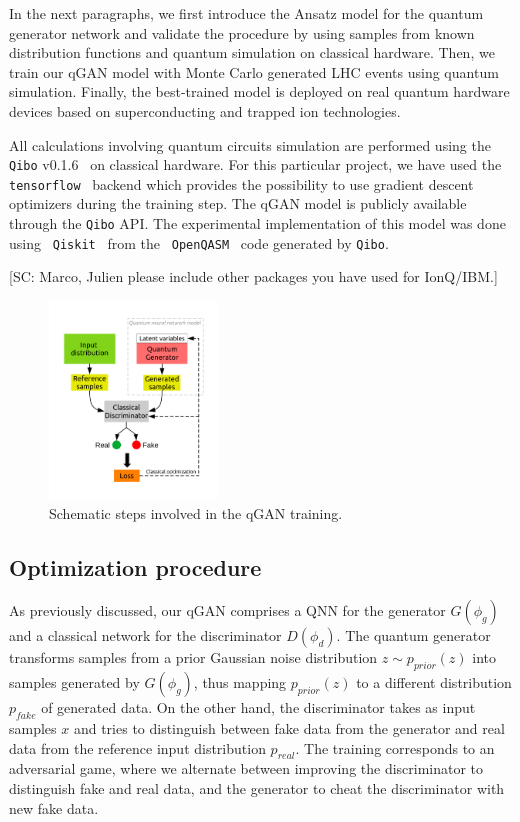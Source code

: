 \documentclass[twocolumn,preprintnumbers,superscriptaddress]{revtex4-2}
\begin{document}
In the next paragraphs, we first introduce the Ansatz model for the quantum
generator network and validate the procedure by using samples from known
distribution functions and quantum simulation on classical hardware. Then, we
train our qGAN model with Monte Carlo generated LHC events using quantum
simulation. Finally, the best-trained model is deployed on real quantum hardware
devices based on superconducting and trapped ion technologies.

All calculations involving quantum circuits simulation are performed using the
{\tt Qibo} v0.1.6~\cite{efthymiou2020qibo,stavros_efthymiou_2021_5088103} on
classical hardware. For this particular project, we have used the {\tt
tensorflow}~\cite{tensorflow2015-whitepaper} backend which provides the
possibility to use gradient descent optimizers during the training step. The
qGAN model is publicly available through the {\tt Qibo} API. The experimental
implementation of this model was done using {\tt
Qiskit}~\cite{gadi_aleksandrowicz_2019_2562111} from the {\tt
OpenQASM}~\cite{cross2017open} code generated by {\tt Qibo}.

{\color{red}[SC: Marco, Julien please include other packages you have used for IonQ/IBM.]}

\begin{figure}
  \includegraphics[width=0.4\textwidth]{plots/scheme.pdf}
  \caption{\label{fig:scheme} Schematic steps involved in the qGAN training.}
\end{figure}

\subsection{Optimization procedure}

As previously discussed, our qGAN comprises a QNN for the generator $G(\phi_g)$ and a classical network for the discriminator $D(\phi_d)$. The quantum generator transforms samples from a prior Gaussian noise distribution $z \sim p_{prior}(z)$ into samples generated by $G(\phi_g)$, thus mapping $p_{prior}(z)$ to a different distribution $p_{fake}$ of generated data. On the other hand, the discriminator takes as input samples $x$ and tries to distinguish between fake data from the generator and real data from the reference input distribution $p_{real}$. The training corresponds to an adversarial game, where we alternate between improving the discriminator to distinguish fake and real data, and the generator to cheat the discriminator with new fake data. 
\end{document}
